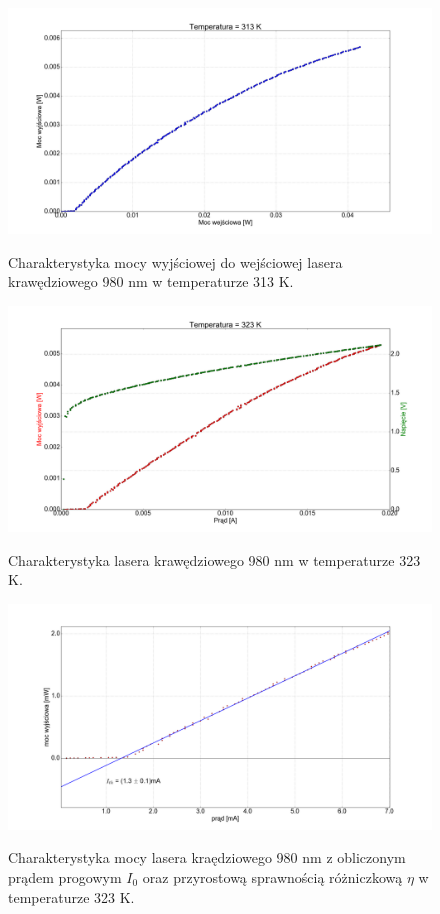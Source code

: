 \documentclass[a4paper, portrait,12pt]{report}
\begin{document}
\begin{figure}
\center
  \includegraphics[scale=0.30]{plot980/temp_40_power.png}
  \label{rys1}
  \caption{Charakterystyka mocy wyjściowej do wejściowej lasera krawędziowego 980 nm w temperaturze 313 K.} 
\end{figure}


\begin{figure}
\center
  \includegraphics[scale=0.30]{plot980/temp_50_IVL.png}
  \label{rys1}
  \caption{Charakterystyka lasera krawędziowego 980 nm w temperaturze 323 K.} 
\end{figure}

\begin{figure}
\center
  \includegraphics[scale=0.30]{plot980/temp_50_fit.png}
  \label{rys1}
  \caption{Charakterystyka mocy lasera kraędziowego 980 nm z obliczonym prądem progowym $I_0$ oraz przyrostową sprawnością różniczkową $\eta$ w temperaturze 323 K.} 
\end{figure}
\end{document}
